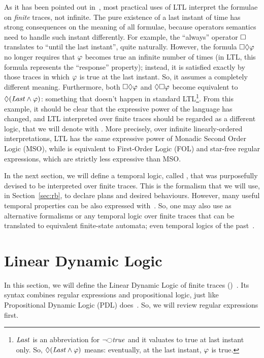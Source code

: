 As it has been pointed out in~\cite{bib:ltlf-ldlf}, most practical uses of LTL
interpret the formulae on \emph{finite} traces, not infinite. The pure
existence of a last instant of time has strong consequences on the meaning of
all formulae, because operators semantics need to handle such instant
differently.  For example, the ``always'' operator $\square$ translates to
``until the last instant'', quite naturally. However, the formula
$\square\lozenge \varphi$ no longer requires that $\varphi$ becomes true
an infinite number of times (in LTL, this formula represents the ``response''
property); instead, it is satisfied exactly by those traces in which
$\varphi$ is true at the last instant. So, it assumes a completely different
meaning.  Furthermore, both $\square\lozenge \varphi$ and
$\lozenge\square \varphi$ become equivalent to $\lozenge (\text{\textit{Last}}
\land \varphi)$: something that doesn't happen in standard LTL\footnote{
	$\text{\textit{Last}}$ is an abbreviation for $\lnot \lnext \true$ and it valuates
	to true at last instant only. So, $\lozenge (\text{\textit{Last}} \land
	\varphi)$ means: eventually, at the last instant, $\varphi$ is true.}.
From this example, it should be clear that the expressive power of the
language has changed, and LTL interpreted over finite traces should be
regarded as a different logic, that we will denote with \ltl{}.  More
precisely, over infinite linearly-ordered interpretations, LTL has the same
expressive power of Monadic Second Order Logic (MSO), while \ltl{} is
equivalent to First-Order Logic (FOL) and star-free regular expressions, which
are strictly less expressive than MSO.

In the next section, we will define a temporal logic, called \ldl{}, that was
purposefully devised to be interpreted over finite traces. This is the
formalism that we will use, in Section~\ref{sec:rb}, to declare plans and
desired behaviours. However, many useful temporal properties can be also
expressed with~\ltl{}. So, one may also use as alternative formalisms \ltl{}
or any temporal logic over finite traces that can be translated to equivalent
finite-state automata; even temporal logics of the
past~\cite{bib:nmrdp-logic-first}.


\section{Linear Dynamic Logic}

In this section, we will define the Linear Dynamic Logic of finite traces
(\ldl{})~\cite{bib:ltlf-ldlf}. Its syntax combines regular expressions and
propositional logic, just like Propositional Dynamic Logic (PDL)
does~\cite{bib:pdl}\cite{bib:pdl-stanford}. So, we will review regular
expressions first.


